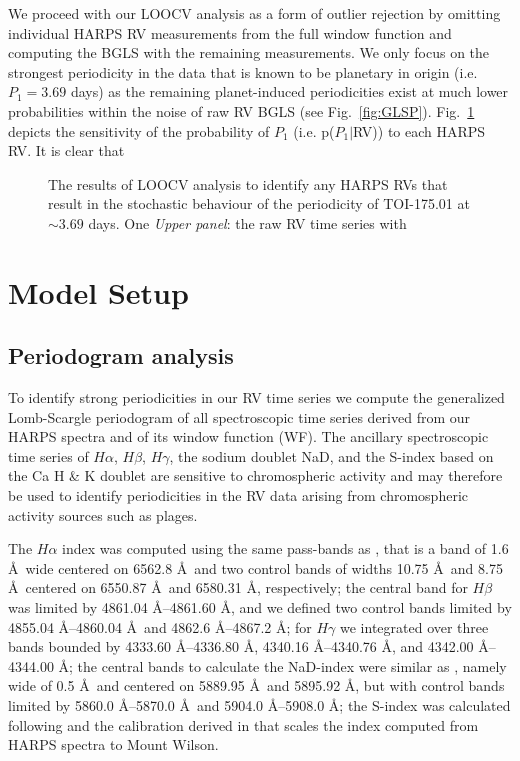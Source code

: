 \documentclass[longauth]{aa}
\begin{document}
We proceed with our LOOCV analysis as a form of outlier rejection by omitting individual HARPS RV measurements from the full window function and computing the BGLS with the remaining measurements. We only focus on the strongest periodicity in the data that is known to be planetary in origin (i.e.$P_1=3.69$ days) as the remaining planet-induced periodicities exist at much lower probabilities within the noise of raw RV BGLS (see Fig.~\ref{fig:GLSP}). Fig.~\ref{fig:loocv} depicts the sensitivity of the probability of $P_1$ (i.e. p($P_1|$RV)) to each HARPS RV. It is clear that  

\begin{figure}
    \centering
    \caption{The results of LOOCV analysis to identify any HARPS RVs that result in the stochastic behaviour of the periodicity of TOI-175.01 at $\sim 3.69$ days. One  \emph{Upper panel}: the raw RV time series with}
    \label{fig:loocv}
\end{figure}
\fi 



\section{Model Setup}
\label{sec:model}

\subsection{Periodogram analysis}
\label{subsec:kep}
To identify strong periodicities in our RV time series we compute the generalized Lomb-Scargle periodogram \citep[GLSP;][]{zechmeister09} of all spectroscopic time series derived from our HARPS spectra and of its window function (WF). The ancillary spectroscopic time series of $H\alpha$, $H\beta$, $H\gamma$, the sodium doublet NaD, and the S-index based on the Ca H \& K doublet are sensitive to chromospheric activity and may therefore be used to identify periodicities in the RV data arising from chromospheric activity sources such as plages.

The $H\alpha$ index was computed using the same pass-bands as \cite{gomesdasilva12}, that is a band of 1.6 \AA\ wide centered on 6562.8 \AA\ and two control bands of widths 10.75 \AA\ and 8.75 \AA\
centered on 6550.87 \AA\ and 6580.31 \AA, respectively; the central 
band for $H\beta$ was limited by 4861.04 \AA--4861.60 \AA, and we defined two control bands limited by
4855.04 \AA--4860.04 \AA\ and 4862.6 \AA--4867.2 \AA; for $H\gamma$ we integrated over three bands
bounded by 4333.60 \AA--4336.80 \AA, 4340.16 \AA--4340.76 \AA, and 4342.00 \AA--4344.00 \AA; 
the central bands to calculate the NaD-index were similar as 
\citet{gomesdasilva12}, namely wide of 0.5 \AA\ and centered on 5889.95 \AA\ and 5895.92 \AA, 
but with control bands limited by 5860.0 \AA--5870.0 \AA\ and 5904.0 \AA--5908.0 \AA; 
the S-index was calculated following \cite{duncan1991} and the calibration derived in
\citet[][Eq.~3]{astudillodefru17b} that scales the index computed from HARPS spectra to Mount Wilson.
\end{document}
